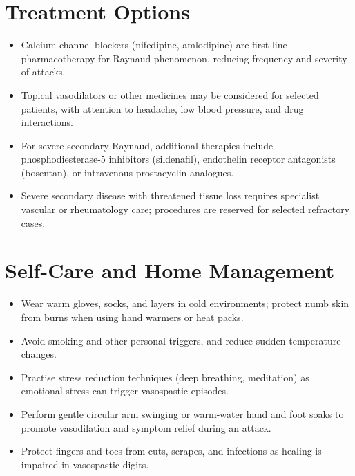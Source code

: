 \section*{Treatment Options}
\begin{itemize}
  \item Calcium channel blockers (nifedipine, amlodipine) are first-line pharmacotherapy for Raynaud phenomenon, reducing frequency and severity of attacks.
  \item Topical vasodilators or other medicines may be considered for selected patients, with attention to headache, low blood pressure, and drug interactions.
  \item For severe secondary Raynaud, additional therapies include phosphodiesterase-5 inhibitors (sildenafil), endothelin receptor antagonists (bosentan), or intravenous prostacyclin analogues.
  \item Severe secondary disease with threatened tissue loss requires specialist vascular or rheumatology care; procedures are reserved for selected refractory cases.
\end{itemize}

\section*{Self-Care and Home Management}
\begin{itemize}
  \item Wear warm gloves, socks, and layers in cold environments; protect numb skin from burns when using hand warmers or heat packs.
  \item Avoid smoking and other personal triggers, and reduce sudden temperature changes.
  \item Practise stress reduction techniques (deep breathing, meditation) as emotional stress can trigger vasospastic episodes.
  \item Perform gentle circular arm swinging or warm-water hand and foot soaks to promote vasodilation and symptom relief during an attack.
  \item Protect fingers and toes from cuts, scrapes, and infections as healing is impaired in vasospastic digits.
\end{itemize}

